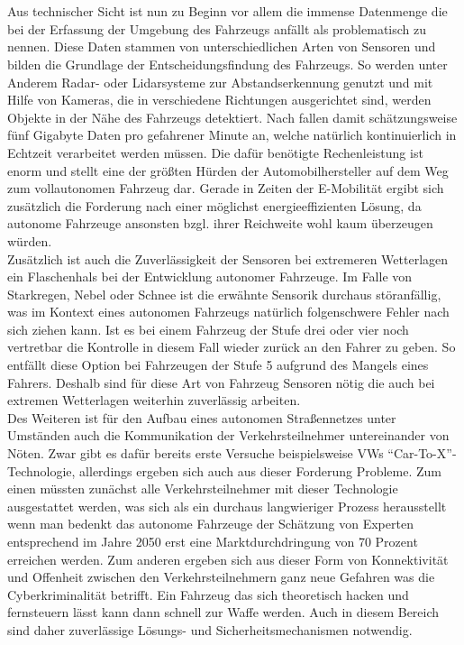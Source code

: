 \documentclass[10pt,a4paper]{article}
\begin{document}
\\
\\
Aus technischer Sicht ist nun zu Beginn vor allem die immense Datenmenge die bei der Erfassung der Umgebung des Fahrzeugs anfällt als problematisch zu nennen. Diese Daten stammen von unterschiedlichen Arten von Sensoren und bilden die Grundlage der Entscheidungsfindung des Fahrzeugs. So werden unter Anderem Radar- oder Lidarsysteme zur Abstandserkennung genutzt und mit Hilfe von Kameras, die in verschiedene Richtungen ausgerichtet sind, werden Objekte in der Nähe des Fahrzeugs detektiert. Nach \cite{StandAutonomesFahren} fallen damit schätzungsweise fünf Gigabyte Daten pro gefahrener Minute an, welche natürlich kontinuierlich in Echtzeit verarbeitet werden müssen. Die dafür benötigte Rechenleistung ist enorm und stellt eine der größten Hürden der Automobilhersteller auf dem Weg zum vollautonomen Fahrzeug dar. Gerade in Zeiten der E-Mobilität ergibt sich zusätzlich die Forderung nach einer möglichst energieeffizienten Lösung, da autonome Fahrzeuge ansonsten bzgl. ihrer Reichweite wohl kaum überzeugen würden. 
\\
Zusätzlich ist auch die Zuverlässigkeit der Sensoren bei extremeren Wetterlagen ein Flaschenhals bei der Entwicklung autonomer Fahrzeuge. Im Falle von Starkregen, Nebel oder Schnee ist die erwähnte Sensorik durchaus störanfällig, was im Kontext eines autonomen Fahrzeugs natürlich folgenschwere Fehler nach sich ziehen kann.  Ist es bei einem Fahrzeug der Stufe drei oder vier noch vertretbar die Kontrolle in diesem Fall wieder zurück an den Fahrer zu geben. So entfällt diese Option bei Fahrzeugen der Stufe 5 aufgrund des Mangels eines Fahrers. Deshalb sind für diese Art von Fahrzeug Sensoren nötig die auch bei extremen Wetterlagen weiterhin zuverlässig arbeiten.
\\
Des Weiteren ist für den Aufbau eines autonomen Straßennetzes unter Umständen auch die Kommunikation der Verkehrsteilnehmer untereinander von Nöten. Zwar gibt es dafür bereits erste Versuche beispielsweise VWs ``Car-To-X''-Technologie, allerdings ergeben sich auch aus dieser Forderung Probleme. Zum einen müssten zunächst alle Verkehrsteilnehmer mit dieser Technologie ausgestattet werden, was sich als ein durchaus langwieriger Prozess herausstellt wenn man bedenkt das autonome Fahrzeuge der Schätzung von Experten entsprechend im Jahre 2050 erst eine Marktdurchdringung von 70 Prozent erreichen werden. Zum anderen ergeben sich aus dieser Form von Konnektivität und Offenheit zwischen den Verkehrsteilnehmern ganz neue Gefahren was die Cyberkriminalität betrifft. Ein Fahrzeug das sich theoretisch hacken und fernsteuern lässt kann dann schnell zur Waffe werden. Auch in diesem Bereich sind daher zuverlässige Lösungs- und Sicherheitsmechanismen notwendig.
\end{document}
